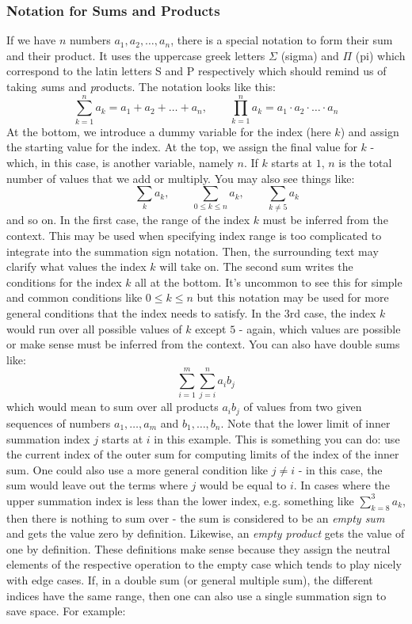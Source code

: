 \subsubsection{Notation for Sums and Products}
\label{Sec:SumsAndProducts}
If we have $n$ numbers $a_1, a_2, \ldots, a_n$, there is a special notation to form their sum and their product. It uses the uppercase greek letters $\Sigma$ (sigma) and $\Pi$ (pi) which correspond to the latin letters S and P respectively which should remind us of taking \emph{s}ums and \emph{p}roducts. The notation looks like this:
\begin{equation}
 \sum_{k=1}^{n}  a_k = a_1   +   a_2   +   \ldots   +   a_n, \qquad
 \prod_{k=1}^{n} a_k = a_1 \cdot a_2 \cdot \ldots \cdot a_n 
\end{equation}
At the bottom, we introduce a dummy variable for the index (here $k$) and assign the starting value for the index. At the top, we assign the final value for $k$ - which, in this case, is another variable, namely $n$. If $k$ starts at $1$, $n$ is the total number of values that we add or multiply. You may also see things like:
\begin{equation}
 \qquad  \sum_{k} a_k,       \qquad
 \sum_{0 \leq k \leq n} a_k, \qquad
 \sum_{k \neq 5} a_k
\end{equation}
and so on. In the first case, the range of the index $k$ must be inferred from the context. This may be used when specifying index range is too complicated to integrate into the summation sign notation. Then, the surrounding text may clarify what values the index $k$ will take on. The second sum writes the conditions for the index $k$ all at the bottom. It's  uncommon to see this for simple and common conditions like $0 \leq k \leq n$ but this notation may be used for more general conditions that the index needs to satisfy. In the 3rd case, the index $k$ would run over all possible values of $k$ except $5$ - again, which values are possible or make sense must be inferred from the context. You can also have double sums like:
\begin{equation}
 \sum_{i=1}^{m} \sum_{j=i}^n  a_i b_j
\end{equation}
which would mean to sum over all products $a_i b_j$ of values from two given sequences of numbers $a_1,\ldots,a_m$ and $b_1,\ldots,b_n$. Note that the lower limit of inner summation index $j$ starts at $i$ in this example. This is something you can do: use the current index of the outer sum for computing limits of the index of the inner sum. One could also use a more general condition like $j \neq i$ - in this case, the sum would leave out the terms where $j$ would be equal to $i$. In cases where the upper summation index is less than the lower index, e.g. something like $\sum_{k=8}^{3} a_k$, then there is nothing to sum over - the sum is considered to be an \emph{empty sum} and gets the value zero by definition. Likewise, an \emph{empty product} gets the value of one by definition. These definitions make sense because they assign the neutral elements of the respective operation to the empty case which tends to play nicely with edge cases. If, in a double sum (or general multiple sum), the different indices have the same range, then one can also use a single summation sign to save space. For example:
